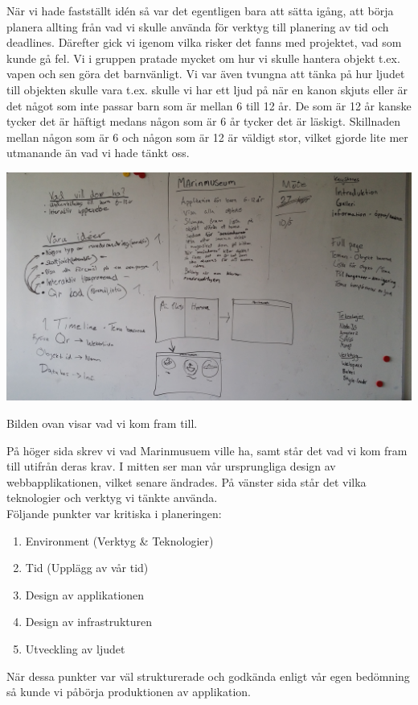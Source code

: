 \documentclass[12pt, titlepage]{article}
\begin{document}
När vi hade fastställt idén så var det egentligen bara att sätta igång, 
att börja planera allting från vad vi skulle använda för verktyg till planering av tid och deadlines. 
Därefter gick vi igenom vilka risker det fanns med projektet, vad som kunde gå fel. 
Vi i gruppen pratade mycket om hur vi skulle hantera objekt t.ex. vapen och sen göra det barnvänligt. 
Vi var även tvungna att tänka på hur ljudet till objekten skulle vara t.ex. skulle vi har ett 
ljud på när en kanon skjuts eller är det något som inte passar barn som är mellan 6 till 12 år. 
De som är 12 år kanske tycker det är häftigt medans någon som är 6 år tycker det är läskigt. 
Skillnaden mellan någon som är 6 och någon som är 12 är väldigt stor, vilket gjorde lite mer utmanande än vad vi hade tänkt oss.
\begin{center}
  \includegraphics[width=1.0\textwidth]{tavla}
\end{center}
\begin{center}
  Bilden ovan visar vad vi kom fram till. 
\end{center}
På höger sida skrev vi vad Marinmusuem ville ha, samt står det vad vi kom 
fram till utifrån deras krav. I mitten ser man vår ursprungliga design av webbapplikationen, vilket senare ändrades. 
På vänster sida står det vilka teknologier och verktyg vi tänkte använda. 
\\
Följande punkter var kritiska i planeringen:
\begin{enumerate}
  \item Environment (Verktyg \& Teknologier)
  \item Tid (Upplägg av vår tid)
  \item Design av applikationen
  \item Design av infrastrukturen
  \item Utveckling av ljudet
\end{enumerate}
När dessa punkter var väl strukturerade och godkända enligt vår egen bedömning så kunde vi påbörja produktionen av applikation.
\newpage
\end{document}
